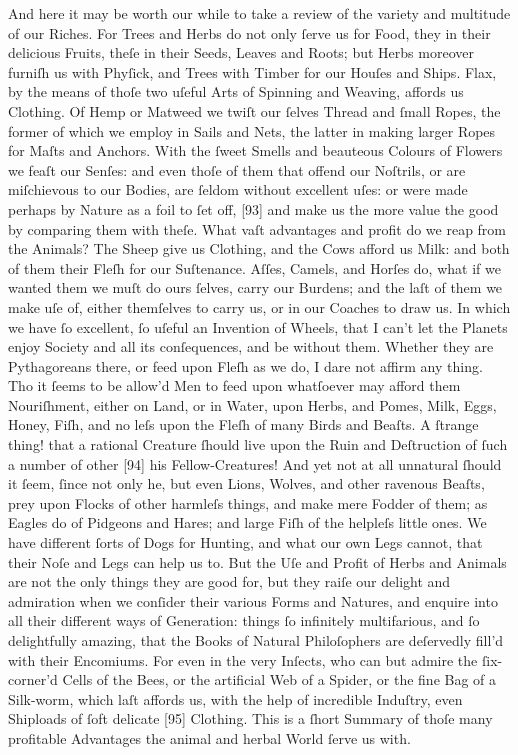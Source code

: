 \documentclass[letterpaper]{book}
\begin{document}
And here it may be worth our while to take a review of the variety and
multitude of our Riches. For Trees and Herbs do not only ſerve us for Food,
they in their delicious Fruits, theſe in their Seeds, Leaves and Roots; but
Herbs moreover furniſh us with Phyſick, and Trees with Timber for our Houſes
and Ships. Flax, by the means of thoſe two uſeful Arts of Spinning and
Weaving, affords us Clothing. Of Hemp or Matweed we twiſt our ſelves Thread
and ſmall Ropes, the former of which we employ in Sails and Nets, the latter
in making larger Ropes for Maſts and Anchors. With the ſweet Smells and
beauteous Colours of Flowers we feaſt our Senſes: and even thoſe of them
that offend our Noſtrils, or are miſchievous to our Bodies, are ſeldom
without excellent uſes: or were made perhaps by Nature as a foil to ſet off,
[93] and make us the more value the good by comparing them with theſe. What
vaſt advantages and profit do we reap from the Animals? The Sheep give us
Clothing, and the Cows afford us Milk: and both of them their Fleſh for our
Suſtenance. Aſſes, Camels, and Horſes do, what if we wanted them we muſt do
ours ſelves, carry our Burdens; and the laſt of them we make uſe of, either
themſelves to carry us, or in our Coaches to draw us. In which we have ſo
excellent, ſo uſeful an Invention of Wheels, that I can't let the Planets
enjoy Society and all its conſequences, and be without them. Whether they
are Pythagoreans there, or feed upon Fleſh as we do, I dare not affirm any
thing. Tho it ſeems to be allow'd Men to feed upon whatſoever may afford
them Nouriſhment, either on Land, or in Water, upon Herbs, and Pomes, Milk,
Eggs, Honey, Fiſh, and no leſs upon the Fleſh of many Birds and Beaſts. A
ſtrange thing! that a rational Creature ſhould live upon the Ruin and
Deſtruction of ſuch a number of other [94] his Fellow-Creatures! And yet not
at all unnatural ſhould it ſeem, ſince not only he, but even Lions, Wolves,
and other ravenous Beaſts, prey upon Flocks of other harmleſs things, and
make mere Fodder of them; as Eagles do of Pidgeons and Hares; and large Fiſh
of the helpleſs little ones. We have different ſorts of Dogs for Hunting,
and what our own Legs cannot, that their Noſe and Legs can help us to. But
the Uſe and Profit of Herbs and Animals are not the only things they are
good for, but they raiſe our delight and admiration when we conſider their
various Forms and Natures, and enquire into all their different ways of
Generation: things ſo infinitely multifarious, and ſo delightfully amazing,
that the Books of Natural Philoſophers are deſervedly fill'd with their
Encomiums. For even in the very Inſects, who can but admire the ſix-corner'd
Cells of the Bees, or the artificial Web of a Spider, or the fine Bag of a
Silk-worm, which laſt affords us, with the help of incredible Induſtry, even
Shiploads of ſoft delicate [95] Clothing. This is a ſhort Summary of thoſe
many profitable Advantages the animal and herbal World ſerve us with.
\end{document}
